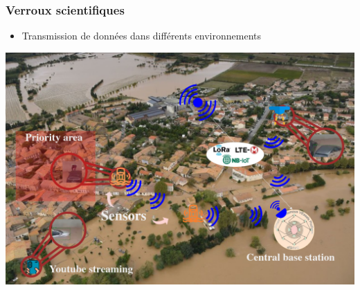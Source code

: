 \begin{frame}
	\frametitle{Verroux scientifiques}
	\vspace{-0.3cm}
	\begin{itemize} 
	\Large \item [\ding{43}] Transmission de données dans différents environnements\\
	\end{itemize}
	\centering
	\includegraphics[scale=0.2]{Files/fig/scenaioLORA2.png}
\end{frame}

